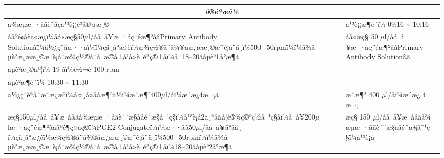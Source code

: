\documentclass[UTF8,10pt,a4paper,fontset=fandol]{ctexart}
\newcommand{\fieldvalue}[1]{#1}
\newcommand{\handwritten}[1]{#1}
\begin{document}
\begin{center}
\begin{center}
\begin{tabularx}{\textwidth}{|p{}|X|}
\hline
\multicolumn{2}{|c|}{\textit{å®éªæä½}}\\
\hline
å¾æµæ ·åãè¯åçå¹³è¡¡è³å®¤æ¸© &
å¹³è¡¡æ¶é´ï¼
\fieldvalue{\handwritten{09:16}}
\quad\textasciitilde\quad
\fieldvalue{\handwritten{10:16}}\\
\hline
ååºé¢åè¢«æ¿ï¼åå«æç§50$\mu$l/å­å å¥æ ·åç¨éæ¶²åâPrimary Antibody Solutionâï¼ä½¿ç¨åæ··åï¼ï¼çä¸å°æ¿èï¼æ¾ç½®å¨å¾®å­æ¿ææ¸©æ¯è¡å¨ä¸ï¼500$\pm$50rpmï¼ï¼å¾å­µè²æ¿ææ¸©æ¯è¡å¨æ¾ç½®å¨å¯æ©å±å¹å»è¯éªç®±åï¼å¨18--20âå­µè²1å°æ¶ã &
åå«æç§
\fieldvalue{\handwritten{50}}
$\mu$l/å­å å¥æ ·åç¨éæ¶²åâPrimary Antibody Solutionâã\\
å­µè²æ¸©åº¦ï¼
\fieldvalue{\handwritten{19}}
âï¼è½¬é
\fieldvalue{\handwritten{100}}
rpm\\
å­µè²æ¶é´ï¼
\fieldvalue{\handwritten{10:30}}
\quad\textasciitilde\quad
\fieldvalue{\handwritten{11:30}}\\
\hline
ä½¿ç¨èªå¨æ´æ¿æºï¼å¤¸å»å­åæ¶²ä½ï¼æ´æ¶²400$\mu$l/å­ï¼æ´æ¿4æ¬¡ã &
æ´æ¶²
\fieldvalue{\handwritten{400}}
$\mu$l/å­ï¼æ´æ¿
\fieldvalue{\handwritten{4}}
æ¬¡\\
\hline
æç§150$\mu$l/å­å å¥æ ååãå¾æµæ ·åãè´¨æ§ååé´æ§å¯¹ç§ï¼å¹³è¡å2ä¸ªå­ãå¦è®¾ç©ºç½å¯¹ç§å­ï¼å å¥200$\mu$læ ·åç¨éæ¶²ãååºé¶ç»åç©ï¼PGE2 Conjugateï¼ï¼æ··åã50$\mu$l/å­å å¥å°å­ä¸­ï¼çä¸å°æ¿èï¼æ¾ç½®å¨å¾®å­æ¿ææ¸©æ¯è¡å¨ä¸ï¼500$\pm$50rpmï¼ï¼å¾å­µè²æ¿ææ¸©æ¯è¡å¨æ¾ç½®å¨å¯æ©å±å¹å»è¯éªç®±åï¼18--20âå­µè²2å°æ¶ã &
æç§
\fieldvalue{\handwritten{150}}
$\mu$l/å­å å¥æ ååãå¾æµæ ·åãè´¨æ§ååé´æ§å¯¹ç§ï¼å¹³è¡å

\end{tabularx}
\end{center}
\end{center}
\end{document}
